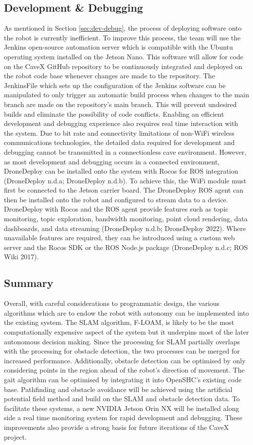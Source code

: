 \subsection{Development \& Debugging}
As mentioned in Section \ref{sec:dev-debug}, the process of deploying software onto the robot is currently inefficient. To improve this process, the team will use the Jenkins open-source automation server which is compatible with the Ubuntu operating system installed on the Jetson Nano. This software will allow for code on the CaveX GitHub repository to be continuously integrated and deployed on the robot code base whenever changes are made to the repository. The JenkinsFile which sets up the configuration of the Jenkins software can be manipulated to only trigger an automatic build process when changes to the main branch are made on the repository's main branch. This will prevent undesired builds and eliminate the possibility of code conflicts. Enabling an efficient development and debugging experience also requires real time interaction with the system. Due to bit rate and connectivity limitations of non-WiFi wireless communications technologies, the detailed data required for development and debugging cannot be transmitted in a connectionless cave environment. However, as most development and debugging occurs in a connected environment, DroneDeploy can be installed onto the system with Rocos for ROS integration (DroneDeploy n.d.a; DroneDeploy n.d.b). To achieve this, the WiFi module must first be connected to the Jetson carrier board. The DroneDeploy ROS agent can then be installed onto the robot and configured to stream data to a device. DroneDeploy with Rocos and the ROS agent provide features such as topic monitoring, topic exploration, bandwidth monitoring, point cloud rendering, data dashboards, and data streaming (DroneDeploy n.d.b; DroneDeploy 2022). Where unavailable features are required, they can be introduced using a custom web server and the Rocos SDK or the ROS Node.js package (DroneDeploy n.d.c; ROS Wiki 2017). 

\subsection{Summary}
Overall, with careful considerations to programmatic design, the various algorithms which are to endow the robot with autonomy can be implemented into the existing system. The SLAM algorithm, F-LOAM, is likely to be the most computationally expensive aspect of the system but it underpins most of the later autonomous decision making. Since the processing for SLAM partially overlaps with the processing for obstacle detection, the two processes can be merged for increased performance. Additionally, obstacle detection can be optimised by only considering points in the region ahead of the robot's direction of movement. The gait algorithm can be optimised by integrating it into OpenSHC's existing code base. Pathfinding and obstacle avoidance will be achieved using the artificial potential field method and build on the SLAM and obstacle detection data. To facilitate these systems, a new NVIDIA Jetson Orin NX will be installed along side a real time monitoring system for rapid development and debugging. These improvements also provide a strong basis for future iterations of the CaveX project.